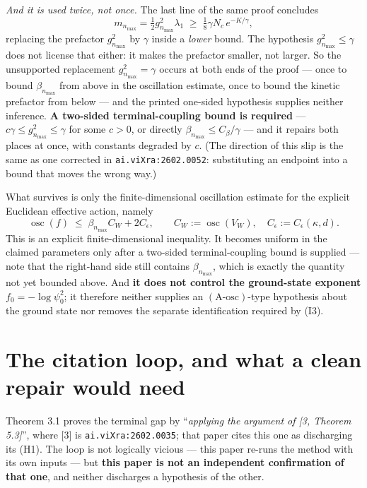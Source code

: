 \documentclass[11pt]{article}
\begin{document}
\emph{And it is used twice, not once.} The last line of the same proof concludes
\[
m_{n_{\max}}=\tfrac{1}{2}g^2_{n_{\max}}\lambda_1
\;\ge\;\tfrac{1}{8}\gamma N_c\,e^{-K/\gamma},
\]
replacing the prefactor $g^2_{n_{\max}}$ by $\gamma$ inside a \emph{lower} bound.
The hypothesis $g^2_{n_{\max}}\le\gamma$ does not license that either: it makes the
prefactor smaller, not larger. So the unsupported replacement
$g^2_{n_{\max}}=\gamma$ occurs at both ends of the proof --- once to bound
$\beta_{n_{\max}}$ from above in the oscillation estimate, once to bound the kinetic
prefactor from below --- and the printed one-sided hypothesis supplies neither
inference. \textbf{A two-sided terminal-coupling bound is required} ---
$c\gamma\le g^2_{n_{\max}}\le\gamma$ for some $c>0$, or directly
$\beta_{n_{\max}}\le C_\beta/\gamma$ --- and it repairs both places at once, with constants
degraded by $c$. (The direction of this slip is the same as one corrected in
\texttt{ai.viXra:2602.0052}: substituting an endpoint into a bound that moves the
wrong way.)

What survives is only the finite-dimensional oscillation estimate for the explicit
Euclidean effective action, namely
\[
\operatorname{osc}(f)\;\le\;\beta_{n_{\max}}C_W+2C_\epsilon ,
\qquad C_W:=\operatorname{osc}(V_W),\quad
C_\epsilon:=C_\epsilon(\kappa,d).
\]
This is an explicit finite-dimensional inequality. It becomes uniform in the claimed
parameters only after a two-sided terminal-coupling bound is supplied --- note that
the right-hand side still contains $\beta_{n_{\max}}$, which is exactly the quantity
not yet bounded above. And \textbf{it does not control the ground-state exponent}
$f_0=-\log\psi_0^2$; it therefore neither supplies an $(\text{A-osc})$-type hypothesis
about the ground state nor removes the separate identification required by (I3).

\section{The citation loop, and what a clean repair would need}

Theorem 3.1 proves the terminal gap by ``\emph{applying the argument of
{\rm[3, Theorem 5.3]}}'', where [3] is \texttt{ai.viXra:2602.0035}; that paper cites
this one as discharging its (H1). The loop is not logically vicious --- this paper
re-runs the method with its own inputs --- but \textbf{this paper is not an independent
confirmation of that one}, and neither discharges a hypothesis of the other.
\end{document}
